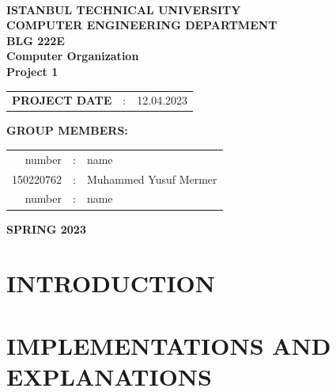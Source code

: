 \documentclass[pdftex,12pt,a4paper]{article}
\begin{document}
\begin{titlepage}
\begin{center}
\textbf{}\\
\textbf{\Large{ISTANBUL TECHNICAL UNIVERSITY}}\\
\vspace{0.5cm}
\textbf{\Large{COMPUTER ENGINEERING DEPARTMENT}}\\
\vspace{2cm}
\textbf{\Large{BLG 222E\\ Computer Organization \\ Project 1}}\\
\vspace{2.8cm}
\begin{table}[ht]
\centering
\Large{
\begin{tabular}{lcl}
\textbf{PROJECT DATE}  & : & 12.04.2023\\
\end{tabular}}
\end{table}
\vspace{1cm}
\textbf{\Large{GROUP MEMBERS:}}\\
\begin{table}[ht]
\centering
\Large{
\begin{tabular}{rcl}
number  & : & name \\
150220762  & : & Muhammed Yusuf Mermer  \\
number  & : & name \\
\end{tabular}}
\end{table}
\vspace{2.8cm}
\textbf{\Large{SPRING 2023}}

\end{center}

\end{titlepage}

\thispagestyle{empty}
\setcounter{tocdepth}{4}
\tableofcontents
\clearpage

\setcounter{page}{1}
\section{INTRODUCTION}


\section{IMPLEMENTATIONS AND EXPLANATIONS }
\end{document}
